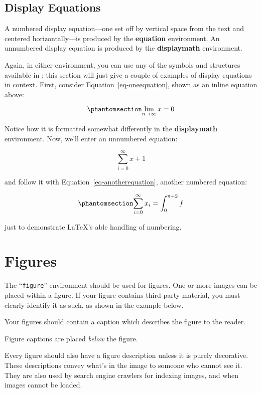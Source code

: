 \documentclass[manuscript,screen]{acmart}
\begin{document}
\subsection{Display Equations}\label{display-equations}

A numbered display equation---one set off by vertical space from the
text and centered horizontally---is produced by the \textbf{equation}
environment. An unnumbered display equation is produced by the
\textbf{displaymath} environment.

Again, in either environment, you can use any of the symbols and
structures available in \LaTeX@; this section will just give a couple of
examples of display equations in context. First, consider
Equation~\ref{eq-oneequation}, shown as an inline equation above:

\begin{equation}\phantomsection\label{eq-oneequation}{
\lim_{n\rightarrow \infty}x=0
}\end{equation}

Notice how it is formatted somewhat differently in the
\textbf{displaymath} environment. Now, we'll enter an unnumbered
equation:

\[\sum_{i=0}^{\infty} x + 1\]

and follow it with Equation~\ref{eq-anotherequation}, another numbered
equation:

\begin{equation}\phantomsection\label{eq-anotherequation}{
\sum_{i=0}^{\infty}x_i=\int_{0}^{\pi+2} f
}\end{equation}

just to demonstrate \LaTeX's able handling of numbering.

\section{Figures}\label{figures}

The ``\texttt{figure}'' environment should be used for figures. One or
more images can be placed within a figure. If your figure contains
third-party material, you must clearly identify it as such, as shown in
the example below.

Your figures should contain a caption which describes the figure to the
reader.

Figure captions are placed \emph{below} the figure.

Every figure should also have a figure description unless it is purely
decorative. These descriptions convey what's in the image to someone who
cannot see it. They are also used by search engine crawlers for indexing
images, and when images cannot be loaded.
\end{document}
